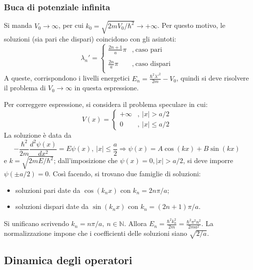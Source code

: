 \documentclass[10pt, a4paper]{scrartcl} %
\numberwithin{equation}{subsection}
\theoremstyle{style2}
\theoremstyle{style1}
\begin{document}
\subsubsection{Buca di potenziale infinita}
Si manda $V_0 \to \infty$, per cui $k_0 = \sqrt{2m V_0 / \hbar ^2} \to +\infty$. 
Per questo motivo, le soluzioni (sia pari che dispari) coincidono con gli asintoti:
\begin{equation}
	\lambda _n ' = \begin{cases}
		\displaystyle \frac{2n+1}{a} \pi & ,\ \text{caso pari}\\
		\\
		\displaystyle \frac{2n}{a} \pi & ,\ \text{caso dispari}\\
	\end{cases} 
\end{equation}
A queste, corrispondono i livelli energetici $E_n = \frac{\hbar ^2 \lambda '^2}{2m} - V_0$, quindi si deve risolvere il problema di $V_0 \to \infty$ in questa espressione.

Per correggere espressione, si considera il problema speculare in cui:
\[
	V(x)=
\begin{cases}
	+\infty &, \ \lvert x \rvert > a / 2\\
	0 &, \ \lvert x \rvert \le a / 2
\end{cases}
\] 
La soluzione \`e data da
\begin{equation}
	-\frac{\hbar ^2}{2m} \frac{d ^2 \psi (x)}{d x^2}  = E \psi (x) , \ \lvert x \rvert \le \frac{a}{2} \Rightarrow  \psi  (x) = A \cos(kx) + B \sin(kx)
\end{equation}
e $k = \sqrt{2mE / \hbar ^2} $; dall'imposizione che $\psi (x) = 0 , \lvert x \rvert > a / 2$, si deve imporre $\psi (\pm a / 2) =0$.
Cos\`i facendo, si trovano due famiglie di soluzioni:
\begin{itemize}
	\item soluzioni pari date da $\cos(k_nx)$ con $k_n = 2n \pi / a$;
	\item soluzioni dispari date da $\sin(k_nx) $ con $k_n = (2n+1) \pi / a$.
\end{itemize}
Si unificano scrivendo $k_n = n \pi / a, \ n \in \mathbb{N}$. 
Allora $E_n = \frac{\hbar ^2 k_n^2}{2m} =  \frac{\hbar ^2 \pi^2 n^2}{2ma^2}$.
La normalizzazione impone che i coefficienti delle soluzioni siano $\sqrt{2 / a} $. 

\subsection{Dinamica degli operatori}
\end{document}
